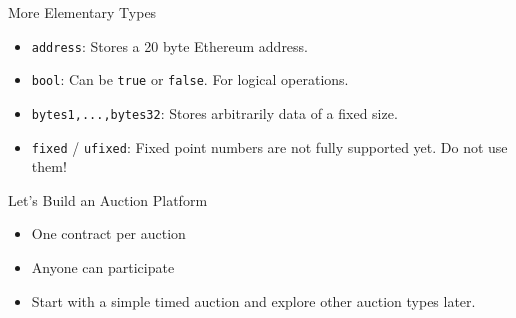 \documentclass[handout]{beamer}
\begin{document}
\begin{frame}{More Elementary Types}

	\begin{itemize}
		\item<1-> \texttt{address}: Stores a 20 byte Ethereum address.
		\item<1-> \texttt{bool}: Can be \texttt{true} or \texttt{false}. For logical operations.
		\item<1-> \texttt{bytes1,...,bytes32}: Stores arbitrarily data of a fixed size.
		\item<1-> \texttt{fixed} / \texttt{ufixed}: Fixed point numbers are not fully supported yet. Do not use them!
	\end{itemize}
	
	\vspace{1em}
	
	
\end{frame}

\begin{frame}{Let's Build an Auction Platform}

	\begin{itemize}
		\item<1-> One contract per auction
		\item<1-> Anyone can participate
		\item<1-> Start with a simple timed auction and explore other auction types later.
	\end{itemize}
	
	
\end{frame}
\end{document}
